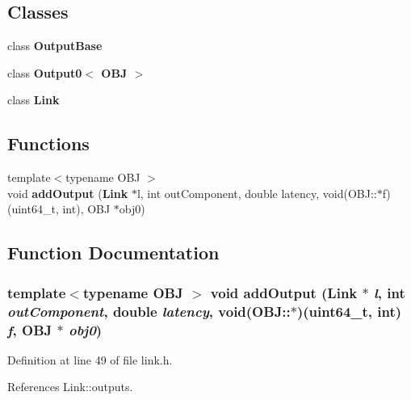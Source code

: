 \subsection*{Classes}
\begin{CompactItemize}
\item 
class {\bf OutputBase}
\item 
class {\bf Output0$<$ OBJ $>$}
\item 
class {\bf Link}
\end{CompactItemize}
\subsection*{Functions}
\begin{CompactItemize}
\item 
{\footnotesize template$<$typename OBJ $>$ }\\void {\bf addOutput} ({\bf Link} $\ast$l, int outComponent, double latency, void(OBJ::$\ast$f)(uint64\_\-t, int), OBJ $\ast$obj0)
\end{CompactItemize}


\subsection{Function Documentation}
\subsubsection[{addOutput}]{\setlength{\rightskip}{0pt plus 5cm}template$<$typename OBJ $>$ void addOutput ({\bf Link} $\ast$ {\em l}, \/  int {\em outComponent}, \/  double {\em latency}, \/  void(OBJ::$\ast$)(uint64\_\-t, int) {\em f}, \/  OBJ $\ast$ {\em obj0})\hspace{0.3cm}{\tt  [inline]}}\label{link_8h_5d79dd8efc21ef444d3a96cdd9f522ab}




Definition at line 49 of file link.h.

References Link::outputs.